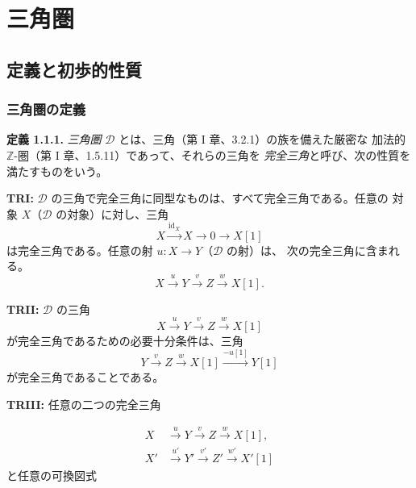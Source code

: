 \chapter{三角圏}
%
\begingroup
\small
\setlength{\abovedisplayskip}{4pt plus 2pt minus 2pt}%
\setlength{\belowdisplayskip}{4pt plus 2pt minus 2pt}%

\section{定義と初歩的性質}

\subsection{三角圏の定義}

\noindent\textbf{定義 1.1.1.}\quad
\emph{三角圏} $\mathcal D$ とは、三角（第 I 章、3.2.1）の族を備えた厳密な
加法的 $\mathbb Z$-圏（第 I 章、1.5.11）であって、それらの三角を
\emph{完全三角}と呼び、次の性質を満たすものをいう。

\smallskip
\noindent\textbf{TRI:}
$\mathcal D$ の三角で完全三角に同型なものは、すべて完全三角である。任意の
対象 $X$（$\mathcal D$ の対象）に対し、三角
\[
  X\xrightarrow{\operatorname{id}_X}X\longrightarrow 0
  \longrightarrow X[1]
\]
は完全三角である。任意の射 $u\colon X\longrightarrow Y$（$\mathcal D$ の射）は、
次の完全三角に含まれる。
\[
  X\xrightarrow{u}Y\xrightarrow{v}Z\xrightarrow{w}X[1].
\]

\noindent\textbf{TRII:}
$\mathcal D$ の三角
\[
  X\xrightarrow{u}Y\xrightarrow{v}Z\xrightarrow{w}X[1]
\]
が完全三角であるための必要十分条件は、三角
\[
  Y\xrightarrow{v}Z\xrightarrow{w}X[1]
  \xrightarrow{-u[1]}Y[1]
\]
が完全三角であることである。

\noindent\textbf{TRIII:}
任意の二つの完全三角

\[
  \begin{aligned}
    X  &\xrightarrow{u}  Y  \xrightarrow{v}  Z  \xrightarrow{w}  X[1],\\
    X' &\xrightarrow{u'} Y' \xrightarrow{v'} Z' \xrightarrow{w'} X'[1]
  \end{aligned}
\]
と任意の可換図式

\begin{center}
\end{center}
\endgroup
